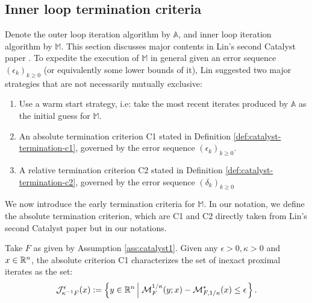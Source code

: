 \documentclass[12pt]{article}
\begin{document}
    \subsection{Inner loop termination criteria}
        Denote the outer loop iteration algorithm by $\mathbb A$, and inner loop iteration algorithm by $\mathbb M$. 
        This section discusses major contents in Lin's second Catalyst paper \cite{lin_catalyst_2018}. 
        To expedite the execution of $\mathbb M$ in general given an error sequence $(\epsilon_k)_{k \ge 0}$ (or equivalently some lower bounds of it), Lin suggested two major strategies that are not necessarily mutually exclusive: 
        \begin{enumerate}
            \item Use a warm start strategy, i.e: take the most recent iterates produced by $\mathbb A$ as the initial guess for $\mathbb M$. 
            \item An absolute termination criterion C1 stated in Definition \ref{def:catalyst-termination-c1}, governed by the error sequence $(\epsilon_k)_{k \ge 0}$. 
            \item A relative termination criterion C2 stated in Definition \ref{def:catalyst-termination-c2}, governed by the error sequence $(\delta_k)_{k \ge 0}$
        \end{enumerate}
        \par
        We now introduce the early termination criteria for $\mathbb M$. 
        In our notation, we define the absolute termination criterion, which are C1 and C2 directly taken from Lin's second Catalyst paper but in our notations. 
        \begin{definition}\label{def:catalyst-termination-c1}
            Take $F$ as given by Assumption \ref{ass:catalyst1}.
            Given any $\epsilon > 0, \kappa > 0$ and $x \in \mathbb R^n$, the absolute criterion C1 characterizes the set of inexact proximal iterates as the set: 
            \begin{align*}
                \mathcal J_{\kappa^{-1} F}^\epsilon (x) := 
                \left\lbrace
                    y \in \mathbb R^n \left | \; 
                            \mathcal M^{1/\kappa}_F (y; x) - 
                            \mathcal M^*_{F, 1/\kappa}(x) \le \epsilon
                    \right.
                \right\rbrace. 
            \end{align*}
        \end{definition}
\end{document}
